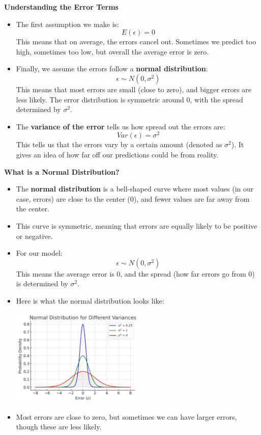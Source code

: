\documentclass[landscape]{slides}
\newcommand{\heading}[1]{%
  \begin{center}
    \large\bf \color{red}
        #1
  \end{center}
  \vspace{1ex minus 1ex}}
\begin{document}
\begin{slide}
	\heading{Understanding the Error Terms}
	\begin{itemize}

		
		\item The first assumption we make is:
		$$E(\epsilon) = 0$$
		This means that on average, the errors cancel out. Sometimes we predict too high, sometimes too low, but overall the average error is zero.
	
		\item Finally, we assume the errors follow a \textbf{normal distribution}:
		$$\epsilon \sim N(0, \sigma^2)$$
		This means that most errors are small (close to zero), and bigger errors are less likely. The error distribution is symmetric around 0, with the spread determined by $\sigma^2$.

	\item The \textbf{variance of the error} tells us how spread out the errors are:
$$Var(\epsilon) = \sigma^2$$
This tells us that the errors vary by a certain amount (denoted as $\sigma^2$). It gives an idea of how far off our predictions could be from reality.

	\end{itemize}
\end{slide}

\begin{slide}
	\heading{What is a Normal Distribution?}
	\begin{itemize}
		\item The \textbf{normal distribution} is a bell-shaped curve where most values (in our case, errors) are close to the center (0), and fewer values are far away from the center.
		
		\item This curve is symmetric, meaning that errors are equally likely to be positive or negative.
		
		\item For our model:
		$$\epsilon \sim N(0, \sigma^2)$$
		This means the average error is 0, and the spread (how far errors go from 0) is determined by $\sigma^2$.
		
		\item Here is what the normal distribution looks like:
		
		\begin{center}
			\includegraphics[width=0.5\textwidth]{normal_distribution.png}
		\end{center}
		\item Most errors are close to zero, but sometimes we can have larger errors, though these are less likely.
	\end{itemize}
\end{slide}
\end{document}
